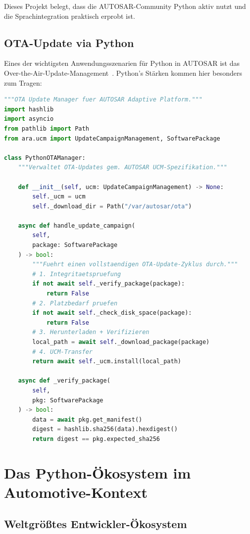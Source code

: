 ﻿\documentclass[12pt,a4paper,twoside]{article}
\begin{document}
Dieses Projekt belegt, dass die AUTOSAR-Community Python aktiv nutzt
und die Sprachintegration praktisch erprobt ist.

\subsection{OTA-Update via Python}
\label{subsec:ota}

Eines der wichtigsten Anwendungsszenarien für Python in AUTOSAR ist
das Over-the-Air-Update-Management~\cite{ota_autosar_ap2021}.
Python's Stärken kommen hier besonders zum Tragen:

\begin{lstlisting}[language=Python,caption={OTA-Update-Manager in Python (AUTOSAR AP)},label=lst:ota]
"""OTA Update Manager fuer AUTOSAR Adaptive Platform."""
import hashlib
import asyncio
from pathlib import Path
from ara.ucm import UpdateCampaignManagement, SoftwarePackage

class PythonOTAManager:
    """Verwaltet OTA-Updates gem. AUTOSAR UCM-Spezifikation."""
    
    def __init__(self, ucm: UpdateCampaignManagement) -> None:
        self._ucm = ucm
        self._download_dir = Path("/var/autosar/ota")
    
    async def handle_update_campaign(
        self,
        package: SoftwarePackage
    ) -> bool:
        """Fuehrt einen vollstaendigen OTA-Update-Zyklus durch."""
        # 1. Integritaetspruefung
        if not await self._verify_package(package):
            return False
        # 2. Platzbedarf pruefen
        if not await self._check_disk_space(package):
            return False
        # 3. Herunterladen + Verifizieren
        local_path = await self._download_package(package)
        # 4. UCM-Transfer
        return await self._ucm.install(local_path)
    
    async def _verify_package(
        self,
        pkg: SoftwarePackage
    ) -> bool:
        data = await pkg.get_manifest()
        digest = hashlib.sha256(data).hexdigest()
        return digest == pkg.expected_sha256
\end{lstlisting}

\section{Das Python-Ökosystem im Automotive-Kontext}
\label{sec:oekosystem}

\subsection{Weltgrößtes Entwickler-Ökosystem}
\label{subsec:entwickler}
\end{document}
